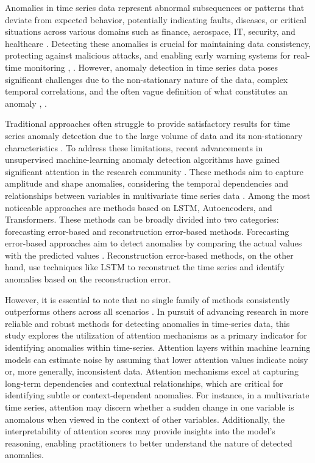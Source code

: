 \documentclass[conference]{IEEEtran}
\begin{document}
Anomalies in time series data represent abnormal subsequences or patterns that deviate from expected behavior, potentially indicating faults, diseases, or critical situations across various domains such as finance, aerospace, IT, security, and healthcare \cite{geiger_tadgan:_2020,ji_novel_2021}.
Detecting these anomalies is crucial for maintaining data consistency, protecting against malicious attacks, and enabling early warning systems for real-time monitoring \cite{ji_novel_2021}, \cite{laptev_generic_2015}. However, anomaly detection in time series data poses significant challenges due to the non-stationary nature of the data, complex temporal correlations, and the often vague definition of what constitutes an anomaly \cite{geiger_tadgan:_2020}, \cite{zhou_anomaly_2021}.

Traditional approaches often struggle to provide satisfactory results for time series anomaly detection due to the large volume of data and its non-stationary characteristics \cite{zhou_anomaly_2021}. To address these limitations, recent advancements in unsupervised machine-learning anomaly detection algorithms have gained significant attention in the research community \cite{audibert_deep_2022,geiger_tadgan:_2020}.
These methods aim to capture amplitude and shape anomalies, considering the temporal dependencies and relationships between variables in multivariate time series data \cite{choi_deep_2021}. Among the most noticeable approaches are methods based on LSTM, Autoencoders, and Transformers. These methods can be broadly divided into two categories: forecasting error-based and reconstruction error-based methods. Forecasting error-based approaches aim to detect anomalies by comparing the actual values with the predicted values \cite{yuan2024novelddpmbasedensembleapproach}. Reconstruction error-based methods, on the other hand, use techniques like LSTM to reconstruct the time series and identify anomalies based on the reconstruction error.

However, it is essential to note that no single family of methods
consistently outperforms others across all scenarios
\cite{audibert_deep_2022}. In pursuit of advancing research in more
reliable and robust methods for detecting anomalies in time-series
data, this study explores the utilization of attention mechanisms as a
primary indicator for identifying anomalies within
time-series. Attention layers within machine learning models can
estimate noise by assuming that lower attention values indicate noisy
or, more generally, inconsistent data. Attention mechanisms excel at
capturing long-term dependencies and contextual relationships, which
are critical for identifying subtle or context-dependent
anomalies. For instance, in a multivariate time series, attention may
discern whether a sudden change in one variable is anomalous when
viewed in the context of other variables. Additionally, the
interpretability of attention scores may provide insights into the
model's reasoning, enabling practitioners to better understand the
nature of detected anomalies.
\end{document}
